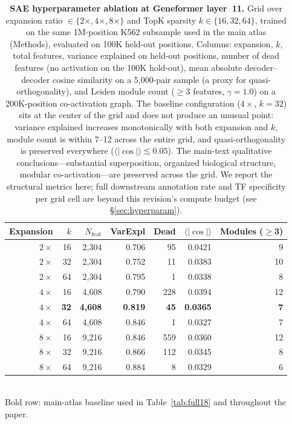 \documentclass[onecolumn]{article}
\begin{document}
\begin{table}[H]
\centering
\caption{\textbf{SAE hyperparameter ablation at Geneformer layer~11.} Grid over expansion ratio $\in \{2\times, 4\times, 8\times\}$ and TopK sparsity $k \in \{16, 32, 64\}$, trained on the same 1M-position K562 subsample used in the main atlas (Methods), evaluated on 100K held-out positions. Columns: expansion, $k$, total features, variance explained on held-out positions, number of dead features (no activation on the 100K hold-out), mean absolute decoder--decoder cosine similarity on a 5{,}000-pair sample (a proxy for quasi-orthogonality), and Leiden module count ($\geq$3 features, $\gamma{=}1.0$) on a 200K-position co-activation graph. The baseline configuration ($4\times$, $k{=}32$) sits at the center of the grid and does not produce an unusual point: variance explained increases monotonically with both expansion and $k$, module count is within 7--12 across the entire grid, and quasi-orthogonality is preserved everywhere ($\langle|\cos|\rangle \lesssim 0.05$). The main-text qualitative conclusions---substantial superposition, organized biological structure, modular co-activation---are preserved across the grid. We report the structural metrics here; full downstream annotation rate and TF specificity per grid cell are beyond this revision's compute budget (see \S\ref{sec:hyperparam}).}
\label{tab:hyperparam}
\smallskip
\small
\begin{tabular}{rrrrrrr}
\toprule
Expansion & $k$ & $N_\text{feat}$ & VarExpl & Dead & $\langle|\cos|\rangle$ & Modules ($\geq$3) \\
\midrule
$2\times$ & 16 & 2{,}304 & 0.706 &  95 & 0.0421 &  9 \\
$2\times$ & 32 & 2{,}304 & 0.752 &  11 & 0.0383 & 10 \\
$2\times$ & 64 & 2{,}304 & 0.795 &   1 & 0.0338 &  8 \\
$4\times$ & 16 & 4{,}608 & 0.790 & 228 & 0.0394 & 12 \\
\textbf{$4\times$} & \textbf{32} & \textbf{4{,}608} & \textbf{0.819} & \textbf{45}  & \textbf{0.0365} & \textbf{7} \\
$4\times$ & 64 & 4{,}608 & 0.846 &   1 & 0.0327 &  7 \\
$8\times$ & 16 & 9{,}216 & 0.846 & 559 & 0.0360 & 12 \\
$8\times$ & 32 & 9{,}216 & 0.866 & 112 & 0.0345 &  8 \\
$8\times$ & 64 & 9{,}216 & 0.884 &   8 & 0.0329 &  6 \\
\bottomrule
\end{tabular}
\\[2pt]
\footnotesize Bold row: main-atlas baseline used in Table~\ref{tab:full18} and throughout the paper.
\end{table}
\end{document}
